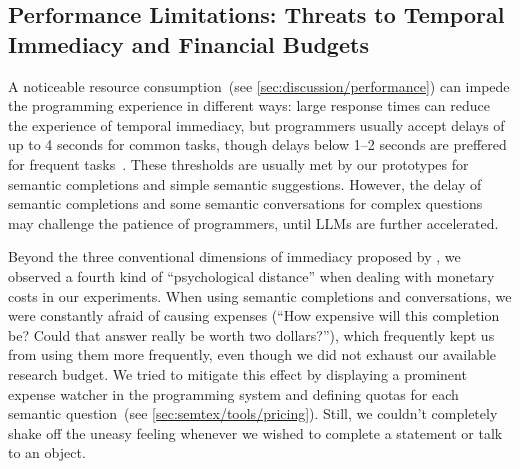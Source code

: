 \subsection{Performance Limitations: Threats to Temporal Immediacy and Financial Budgets}
\label{sec:discussion/experience/performance}

A noticeable resource consumption~(see \cref{sec:discussion/performance}) can impede the programming experience in different ways:
large response times can reduce the experience of temporal immediacy, but programmers usually accept delays of up to 4 seconds for common tasks, though delays below 1--2 seconds are preffered for frequent tasks~\cite[p.~473]{shneiderman2005designing}.
These thresholds are usually met by our prototypes for semantic completions and simple semantic suggestions.
However, the delay of semantic completions and some semantic conversations for complex questions may challenge the patience of programmers, until LLMs are further accelerated.

Beyond the three conventional dimensions of immediacy proposed by \cite{ungar1997debugging}, we observed a fourth kind of ``psychological distance'' when dealing with monetary costs in our experiments.
When using semantic completions and conversations, we were constantly afraid of causing expenses (``How expensive will this completion be? Could that answer really be worth two dollars?''), which frequently kept us from using them more frequently, even though we did not exhaust our available research budget.
We tried to mitigate this effect by displaying a prominent expense watcher in the programming system and defining quotas for each semantic question~(see \cref{sec:semtex/tools/pricing}).
Still, we couldn't completely shake off the uneasy feeling whenever we wished to complete a statement or talk to an object.

